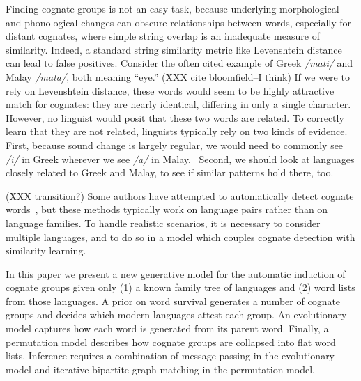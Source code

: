\documentclass[11pt,a4paper]{article}
\begin{document}
Finding cognate groups is not an easy task, because underlying
morphological and phonological changes can obscure relationships
between words, especially for distant cognates, where simple string
overlap is an inadequate measure of similarity. Indeed, a standard
string similarity metric like Levenshtein distance can lead to false
positives. Consider the often cited example of Greek
\textit{/mati/} and Malay \textit{/mata/}, both meaning
``eye.'' (XXX cite bloomfield--I think) If we were to rely on
Levenshtein distance, these words would seem to be highly attractive
match for cognates: they are nearly identical, differing in only a
single character.  However, no linguist would posit that these two
words are related. To correctly learn that they are not related,
linguists typically rely on two kinds of evidence. First, because
sound change is largely regular, we would need to commonly see
\textit{/i/} in Greek wherever we see \textit{/a/} in
Malay.~\cite{ross50philological} Second,
we should look at languages closely related to Greek and Malay, to
see if similar patterns hold there, too.

(XXX transition?) Some authors have
attempted to automatically detect cognate
words~\cite{lowe94reconstruction,oakes00computer,Kondrak01identifyingcognates,mulloni07automatic,mann01multipath},
but these methods typically work on language pairs rather than on
language families.  To handle realistic scenarios, it is
necessary to consider multiple languages, and to do so in a model
which couples cognate detection with similarity learning.

In this paper we present a new generative model for the automatic
induction of cognate groups given only (1) a known family tree of
languages and (2) word lists from those languages.  A prior on word
survival generates a number of cognate groups and decides which
modern languages attest each group.  An evolutionary model captures
how each word is generated from its parent word.  Finally, a
permutation model describes how cognate groups are collapsed into
flat word lists.  Inference requires a combination of message-passing
in the evolutionary model and iterative bipartite graph matching
in the permutation model.
\end{document}
